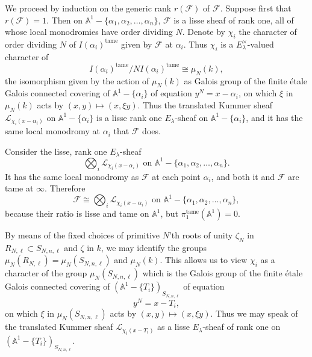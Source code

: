 
We proceed by induction on the generic rank \(r(\mathcal{F})\) of
\(\mathcal{F}\). Suppose first that \(r(\mathcal{F})=1\). Then on
\(\mathbb{A}^1-\{\alpha_1,\alpha_2,\ldots,\alpha_n\}\), \(\mathcal{F}\) is a
lisse sheaf of rank one, all of whose local monodromies have order dividing
\(N\). Denote by \(\chi_i\) the character of order dividing \(N\) of
\(I(\alpha_i)^{\mathrm{tame}}\) given by \(\mathcal{F}\) at \(\alpha_i\). Thus
\(\chi_i\) is a \(E_\lambda^\times\)-valued character of
\[
  I(\alpha_i)^{\mathrm{tame}}/NI(\alpha_i)^{\mathrm{tame}}\cong\mu_N(k),
\]
the isomorphism given by the action of \(\mu_N(k)\) as Galois group of the
finite étale Galois connected covering of
\(\mathbb{A}^1-\{\alpha_i\}\) of equation \(y^N=x-\alpha_i\), on which
\(\xi\) in \(\mu_N(k)\) acts by \((x,y)\mapsto(x,\xi y)\). Thus the translated
Kummer sheaf \(\mathcal{L}_{\chi_i(x-\alpha_i)}\) on
\(\mathbb{A}^1-\{\alpha_i\}\) is a lisse rank one \(E_\lambda\)-sheaf on
\(\mathbb{A}^1-\{\alpha_i\}\), and it has the same local monodromy at
\(\alpha_i\) that \(\mathcal{F}\) does.

Consider the lisse, rank one \(E_\lambda\)-sheaf
\[
  \bigotimes_i\mathcal{L}_{\chi_i(x-\alpha_i)}
  \text{ on }\mathbb{A}^1-\{\alpha_1,\alpha_2,\ldots,\alpha_n\}.
\]
It has the same local monodromy as \(\mathcal{F}\) at each point
\(\alpha_i\), and both it and \(\mathcal{F}\) are tame at \(\infty\).
Therefore
\[
  \mathcal{F}\cong
  \bigotimes_i\mathcal{L}_{\chi_i(x-\alpha_i)}
  \text{ on }\mathbb{A}^1-\{\alpha_1,\alpha_2,\ldots,\alpha_n\},
\]
because their ratio is lisse and tame on \(\mathbb{A}^1\), but
\(\pi_1^{\mathrm{tame}}(\mathbb{A}^1)=0\).

By means of the fixed choices of primitive \(N\)'th roots of unity \(\zeta_N\)
in \(R_{N,\ell}\subset S_{N,n,\ell}\) and \(\zeta\) in \(k\), we may identify
the groups \(\mu_N(R_{N,\ell})=\mu_N(S_{N,n,\ell})\) and \(\mu_N(k)\). This
allows us to view \(\chi_i\) as a character of the group
\(\mu_N(S_{N,n,\ell})\) which is the Galois group of the finite étale Galois
connected covering of \((\mathbb{A}^1-\{T_i\})_{S_{N,n,\ell}}\) of equation
\[
  y^N=x-T_i,
\]
on which \(\xi\) in \(\mu_N(S_{N,n,\ell})\) acts by
\((x,y)\mapsto(x,\xi y)\). Thus we may speak of the translated Kummer sheaf
\(\mathcal{L}_{\chi_i(x-T_i)}\) as a lisse \(E_\lambda\)-sheaf of rank one on
\((\mathbb{A}^1-\{T_i\})_{S_{N,n,\ell}}\).

